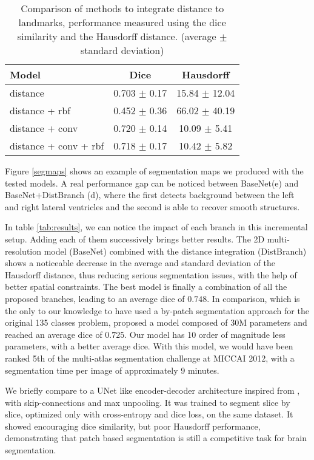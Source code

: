 \documentclass{article}
\begin{document}
\begin{table}
  \centering
  \begin{tabular}{l|c|c}
    Model & Dice & Hausdorff \\
    \hline
    distance & 0.703 $\pm$ 0.17 & 15.84 $\pm$ 12.04\\
    distance + rbf & 0.452 $\pm$ 0.36 & 66.02 $\pm$ 40.19\\
    distance + conv & 0.720 $\pm$ 0.14 & 10.09 $\pm$ 5.41\\
    distance + conv + rbf & 0.718 $\pm$ 0.17 & 10.42 $\pm$ 5.82\\
  \end{tabular}
  \caption{Comparison of methods to integrate distance to landmarks, performance measured using the dice similarity and the Hausdorff distance. (average $\pm$ standard deviation)}
  \label{tab:distance}
\end{table}
Figure \ref{segmaps} shows an example of segmentation maps we produced with the tested models. A real performance gap can be noticed between BaseNet(e) and BaseNet+DistBranch (d), where the first detects background between the left and right lateral ventricles and the second is able to recover smooth structures.

In table \ref{tab:results}, we can notice the impact of each branch in this incremental setup. Adding each of them successively brings better results.
The 2D multi-resolution model (BaseNet) combined with the distance integration (DistBranch) shows a noticeable decrease in the average and standard deviation of the Hausdorff distance, thus reducing serious segmentation issues, with the help of better spatial constraints. The best model is finally a combination of all the proposed branches, leading to an average dice of $0.748$. In comparison, \cite{brebisson} which is the only to our knowledge to have used a by-patch segmentation approach for the original 135 classes problem, proposed a model composed of 30M parameters and reached an average dice of $0.725$. Our model has 10 order of magnitude less parameters, with a better average dice. With this model, we would have been ranked 5th of the multi-atlas segmentation challenge at MICCAI 2012, with a segmentation time per image of approximately 9 minutes.

We briefly compare to a UNet \cite{unet} like encoder-decoder architecture inspired from \cite{DBLP:journals/corr/RoyCSKNW17}, with skip-connections and max unpooling. It was trained to segment slice by slice, optimized only with cross-entropy and dice loss, on the same dataset. It showed encouraging dice similarity, but poor Hausdorff performance, demonstrating that patch based segmentation is still a competitive task for brain segmentation.
\end{document}
